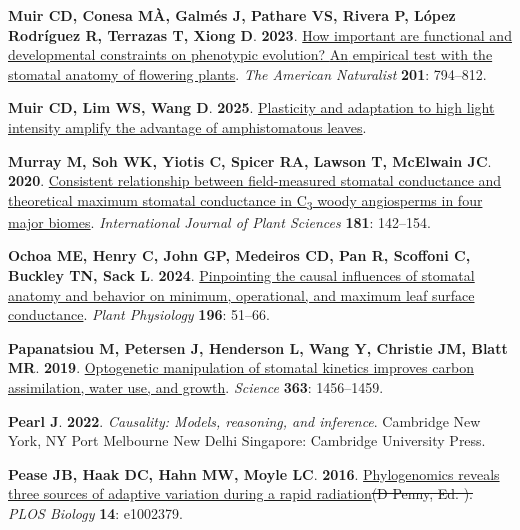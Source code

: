 \documentclass[
  letterpaper,
  DIV=11,
  numbers=noendperiod]{scrartcl}
\newlength{\cslhangindent}
\newenvironment{CSLReferences}[2] %
 {\begin{list}{}{%
  \setlength{\itemindent}{0pt}
  \setlength{\leftmargin}{0pt}
  \setlength{\parsep}{0pt}
  \ifodd #1
   \setlength{\leftmargin}{\cslhangindent}
   \setlength{\itemindent}{-1\cslhangindent}
  \fi
  \setlength{\itemsep}{#2\baselineskip}}}
 {\end{list}}
\providecommand{\DIFaddtex}[1]{{\protect\color{blue}\uwave{#1}}} %
\providecommand{\DIFdeltex}[1]{{\protect\color{red}\sout{#1}}}                      %
\providecommand{\DIFaddbegin}{} %
\providecommand{\DIFaddend}{} %
\providecommand{\DIFdelbegin}{} %
\providecommand{\DIFdelend}{} %
\providecommand{\DIFadd}[1]{\texorpdfstring{\DIFaddtex{#1}}{#1}} %
\providecommand{\DIFdel}[1]{\texorpdfstring{\DIFdeltex{#1}}{}} %
\newcommand{\DIFscaledelfig}{0.5}
\newlength{\DIFdelgraphicswidth} %
\newlength{\DIFdelgraphicsheight} %
\newcommand{\DIFaddincludegraphics}[2][]{{\color{blue}\fbox{\DIFOincludegraphics[#1]{#2}}}} %
\newcommand{\DIFdelincludegraphics}[2][]{%
\sbox{\DIFdelgraphicsbox}{\DIFOincludegraphics[#1]{#2}}%
\settoboxwidth{\DIFdelgraphicswidth}{\DIFdelgraphicsbox} %
\settoboxtotalheight{\DIFdelgraphicsheight}{\DIFdelgraphicsbox} %
\scalebox{\DIFscaledelfig}{%
\parbox[b]{\DIFdelgraphicswidth}{\usebox{\DIFdelgraphicsbox}\\[-\baselineskip] \rule{\DIFdelgraphicswidth}{0em}}\llap{\resizebox{\DIFdelgraphicswidth}{\DIFdelgraphicsheight}{%
\setlength{\unitlength}{\DIFdelgraphicswidth}%
\begin{picture}(1,1)%
\thicklines\linethickness{2pt} %
{\color[rgb]{1,0,0}\put(0,0){\framebox(1,1){}}}%
{\color[rgb]{1,0,0}\put(0,0){\line( 1,1){1}}}%
{\color[rgb]{1,0,0}\put(0,1){\line(1,-1){1}}}%
\end{picture}%
}\hspace*{3pt}}} %
} %
\DeclareRobustCommand{\DIFaddbegin}{\DIFOaddbegin \let\includegraphics\DIFaddincludegraphics} %
\DeclareRobustCommand{\DIFaddend}{\DIFOaddend \let\includegraphics\DIFOincludegraphics} %
\DeclareRobustCommand{\DIFdelbegin}{\DIFOdelbegin \let\includegraphics\DIFdelincludegraphics} %
\DeclareRobustCommand{\DIFdelend}{\DIFOaddend \let\includegraphics\DIFOincludegraphics} %
\begin{document}
\begin{CSLReferences}{0}{1}
\textbf{\textbf{Muir CD}, \textbf{Conesa MÀ}, \textbf{Galmés J},
\textbf{Pathare VS}, \textbf{Rivera P}, \textbf{López Rodríguez R},
\textbf{Terrazas T}, \textbf{Xiong D}}. \textbf{2023}.
\href{https://doi.org/10.1086/723780}{How important are functional and
developmental constraints on phenotypic evolution? {An} empirical test
with the stomatal anatomy of flowering plants}. \emph{The American
Naturalist} \textbf{201}: 794--812.

\textbf{\textbf{Muir CD}, \textbf{Lim WS}, \textbf{Wang D}}.
\textbf{2025}.
\href{https://doi.org/10.1101/2025.08.19.671015}{Plasticity and
adaptation to high light intensity amplify the advantage of
amphistomatous leaves}.

\textbf{\textbf{Murray M}, \textbf{Soh WK}, \textbf{Yiotis C},
\textbf{Spicer RA}, \textbf{Lawson T}, \textbf{McElwain JC}}.
\textbf{2020}. \href{https://doi.org/10.1086/706260}{Consistent
relationship between field-measured stomatal conductance and theoretical
maximum stomatal conductance in {C}{\textsubscript{3}} woody angiosperms
in four major biomes}. \emph{International Journal of Plant Sciences}
\textbf{181}: 142--154.

\textbf{\textbf{Ochoa ME}, \textbf{Henry C}, \textbf{John GP},
\textbf{Medeiros CD}, \textbf{Pan R}, \textbf{Scoffoni C},
\textbf{Buckley TN}, \textbf{Sack L}}. \textbf{2024}.
\href{https://doi.org/10.1093/plphys/kiae292}{Pinpointing the causal
influences of stomatal anatomy and behavior on minimum, operational, and
maximum leaf surface conductance}. \emph{Plant Physiology} \textbf{196}:
51--66.

\textbf{\textbf{Papanatsiou M}, \textbf{Petersen J}, \textbf{Henderson
L}, \textbf{Wang Y}, \textbf{Christie JM}, \textbf{Blatt MR}}.
\textbf{2019}.
\href{https://doi.org/10.1126/science.aaw0046}{Optogenetic manipulation
of stomatal kinetics improves carbon assimilation, water use, and
growth}. \emph{Science} \textbf{363}: 1456--1459.

\textbf{\textbf{Pearl J}}. \textbf{2022}. \emph{Causality: Models,
reasoning, and inference}. Cambridge New York, NY Port Melbourne New
Delhi Singapore: Cambridge University Press.

\textbf{\textbf{Pease JB}, \textbf{Haak DC}, \textbf{Hahn MW},
\textbf{Moyle LC}}. \textbf{2016}.
\href{https://doi.org/10.1371/journal.pbio.1002379}{Phylogenomics
reveals three sources of adaptive variation during a rapid radiation}\DIFdelbegin \DIFdel{(D
Penny, Ed.
). }\DIFdelend \DIFaddbegin \DIFadd{.
}\DIFaddend \emph{PLOS Biology} \textbf{14}: e1002379.


\end{CSLReferences}
\end{document}
